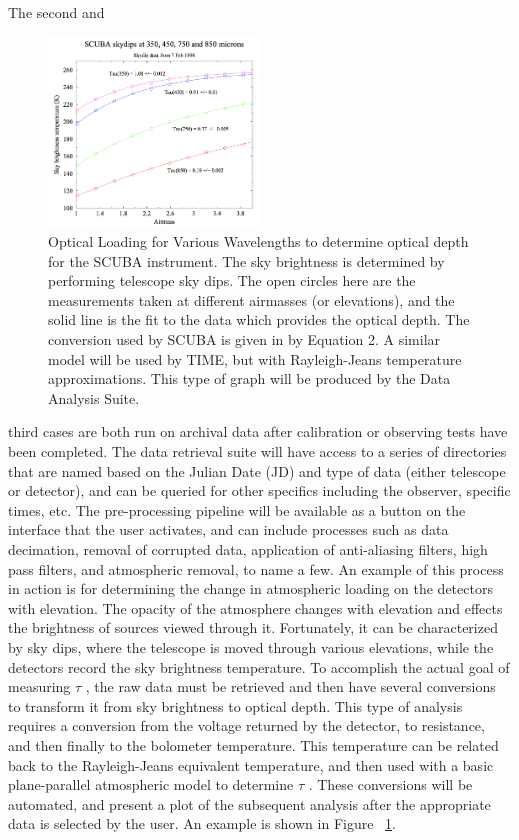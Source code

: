 \documentclass[manuscript]{aastex}
\begin{document}
The second and 
\begin{figure}
\vspace{-0.8cm}
  \begin{center}
    \includegraphics[width=0.5\textwidth]{tau.png}
   \end{center}
\caption[SCUBA Optical Loading Skydips -(\cite{Archibald2002})]{Optical Loading for Various Wavelengths to determine optical depth for the SCUBA instrument. The sky brightness is determined by performing telescope sky dips. The open circles here are the measurements taken at different airmasses (or elevations), and the solid line is the fit to the data which provides the optical depth. The conversion used by SCUBA is given in \cite{Archibald2002} by Equation 2. A similar model will be used by TIME, but with Rayleigh-Jeans temperature approximations. This type of graph will be produced by the Data Analysis Suite.}
\label{fig:tau}
\end{figure}
third cases are both run on archival data after calibration or observing tests have been completed. The data retrieval suite will have access to a series of directories that are named based on the Julian Date (JD) and type of data (either telescope or detector), and can be queried for other specifics including the observer, specific times, etc. The pre-processing pipeline will be available as a button on the interface that the user activates, and can include processes such as data decimation, removal of corrupted data, application of anti-aliasing filters, high pass filters, and atmospheric removal, to name a few. An example of this process in action is for determining the change in atmospheric loading on the detectors with elevation. The opacity of the atmosphere changes with elevation and effects the brightness of sources viewed through it. Fortunately, it can be characterized by sky dips, where the telescope is moved through various elevations, while the detectors record the sky brightness temperature. To accomplish the actual goal of measuring \(\tau \) , the raw data must be retrieved and then have several conversions to transform it from sky brightness to optical depth. This type of analysis requires a conversion from the voltage returned by the detector, to resistance, and then finally to the bolometer temperature. This temperature can be related back to the Rayleigh-Jeans equivalent temperature, and then used with a basic plane-parallel atmospheric model to determine \(\tau\) . These conversions will be automated, and present a plot of the subsequent analysis after the appropriate data is selected by the user. An example is shown in Figure ~\ref{fig:tau}.
\end{document}
